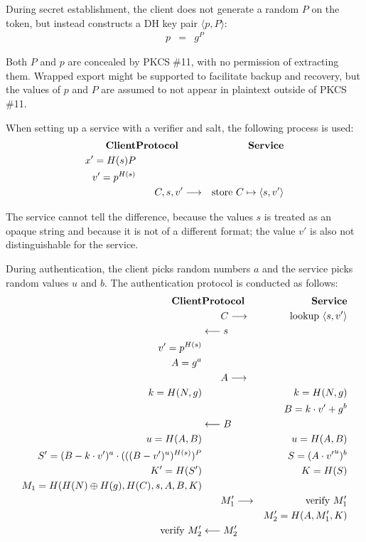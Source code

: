\documentclass[a4paper,11pt]{article}
\def\pkcs11{PKCS$\;$\#11\xspace}
\def\tol#1{\longleftarrow\strut{}#1\strut\phantom{\longrightarrow}}
\def\tor#1{\phantom{\longleftarrow\strut}#1\strut\longrightarrow}
\begin{document}
During secret establishment, the client does not generate a random $P$ on the token, but instead constructs a DH key pair $\langle p,P\rangle$:
%
\begin{eqnarray*}
p &=& g^P
\end{eqnarray*}

Both $P$ and $p$ are concealed by \pkcs11, with no permission of extracting them.  Wrapped export might be supported to facilitate backup and recovery, but the values of $p$ and $P$ are assumed to not appear in plaintext outside of \pkcs11.

When setting up a service with a verifier and salt, the following process is used:
%
\begin{eqnarray*}
\textbf{Client}&\textbf{Protocol}&\textbf{Service}\\
x'=H(s) P&&\\
v'=p^{H(s)}&&\\
&\tor{C,s,v'}&\textrm{store $C\mapsto\langle s,v'\rangle$}
\end{eqnarray*}

The service cannot tell the difference, because the values $s$ is treated as an opaque string and because it is not of a different format; the value $v'$ is also not distinguishable for the service.

During authentication, the client picks random numbers $a$ and the service picks random values $u$ and $b$.  The authentication protocol is conducted as follows:
%
\begin{eqnarray*}
\textbf{Client}&\textbf{Protocol}&\textbf{Service}\\
&\tor{C}&\textrm{lookup $\langle s,v'\rangle$}\\
&\tol{s}&\\
v'=p^{H(s)}&&\\
A=g^a&&\\
&\tor{A}&\\
k=H(N,g)&&k=H(N,g)\\
&&B=k\cdot v'+g^b\\
&\tol{B}&\\
u=H(A,B)&&u=H(A,B)\\
S'=(B-k\cdot v')^a\cdot (((B-v')^u)^{H(s)})^P && S=(A\cdot {v'}^u)^b\\
K'=H(S')&&K=H(S)\\
M_1=H(H(N)\oplus H(g),H(C),s,A,B,K)&&\\
&\tor{M_1'}&\textrm{verify $M_1'$}\\
&&M_2'=H(A,M_1',K)\\
\textrm{verify $M_2'$}&\tol{M_2'}&
\end{eqnarray*}
\end{document}
